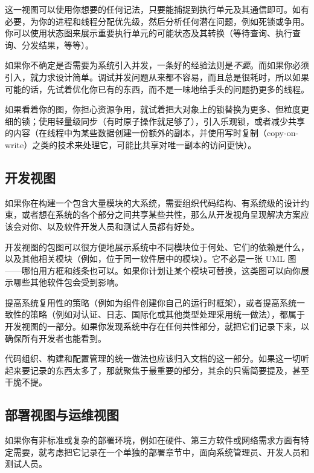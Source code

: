 这一视图可以使用你想要的任何记法，只要能捕捉到执行单元及其通信即可。如有必要，为你的进程和线程分配优先级，然后分析任何潜在问题，例如死锁或争用。你可以使用状态图来展示重要执行单元的可能状态及其转换（等待查询、执行查询、分发结果，等等）。

\label{idx:231}
如果你不确定是否需要为系统引入并发，一条好的经验法则是\emph{不要}。而如果你必须引入，就力求设计简单。调试并发问题从来都不容易，而且总是很耗时，所以如果可能的话，先试着优化你已有的东西，而不是一味地给手头的问题扔更多的线程。

\label{idx:232}
如果看着你的图，你担心资源争用，就试着把大对象上的锁替换为更多、但粒度更细的锁；使用轻量级同步（有时原子操作就足够了），引入乐观锁，或者减少共享的内容（在线程中为某些数据创建一份额外的副本，并使用写时复制（copy-on-write）之类的技术来处理它，可能比共享对唯一副本的访问更快）。

\subsection{开发视图}

\label{idx:233}
\label{idx:234}
如果你在构建一个包含大量模块的大系统，需要组织代码结构、有系统级的设计约束，或者想在系统的各个部分之间共享某些共性，那么从开发视角呈现解决方案应该会对你、以及软件开发人员和测试人员都有好处。

开发视图的包图可以很方便地展示系统中不同模块位于何处、它们的依赖是什么，以及其他相关模块（例如，位于同一软件层中的模块）。它不必是一张 UML 图——哪怕用方框和线条也可以。如果你计划让某个模块可替换，这类图可以向你展示哪些其他软件包会受到影响。

提高系统复用性的策略（例如为组件创建你自己的运行时框架），或者提高系统一致性的策略（例如对认证、日志、国际化或其他类型处理采用统一做法），都属于开发视图的一部分。如果你发现系统中存在任何共性部分，就把它们记录下来，以确保所有开发者也能看到。

代码组织、构建和配置管理的统一做法也应该归入文档的这一部分。如果这一切听起来要记录的东西太多了，那就聚焦于最重要的部分，其余的只需简要提及，甚至干脆不提。

\subsection{部署视图与运维视图}

\label{idx:235}
\label{idx:236}
\label{idx:237}
\label{idx:238}
如果你有非标准或复杂的部署环境，例如在硬件、第三方软件或网络需求方面有特定需要，就考虑把它记录在一个单独的部署章节中，面向系统管理员、开发人员和测试人员。

